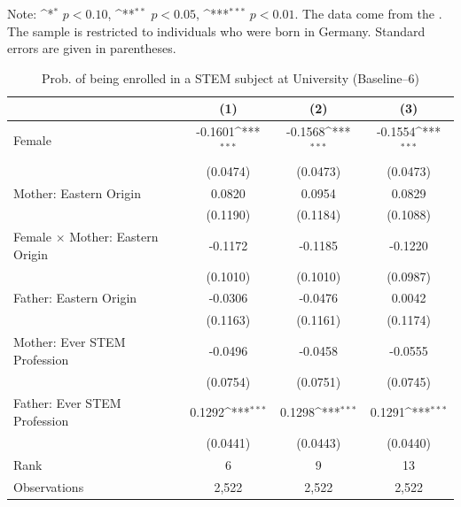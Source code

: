 \documentclass[a4paper, oneside, hyperfootnotes = false]{article}
\def\sym#1{\ifmmode^{#1}\else\(^{#1}\)\fi}
\begin{document}
{\begin{table}[ht]
\begin{center}
		\vspace{2mm}
		
		\parbox{10cm}{
			\linespread{1}\footnotesize Note: \sym{*} \(p<0.10\), \sym{**} \(p<0.05\), \sym{***} \(p<0.01\). The data come from the \cite{SOEP2023}. The sample is restricted to individuals who were born in Germany. Standard errors are given in parentheses.}
		
	\end{center}
\end{table}

\begin{table}[ht]
	\caption[STEM subject at University (Baseline--6)]{Prob. of being enrolled in a STEM subject at University (Baseline--6)}
	\label{tab:baseline--6}
	\begin{center}
		\begin{tabular}{l*{3}{c}}
			\toprule
			&\multicolumn{1}{c}{(1)}         &\multicolumn{1}{c}{(2)}         &\multicolumn{1}{c}{(3)}         \\
			\midrule
			Female              &     -0.1601\sym{***}&     -0.1568\sym{***}&     -0.1554\sym{***}\\
			&    (0.0474)         &    (0.0473)         &    (0.0473)         \\
			\addlinespace
			Mother: Eastern Origin&      0.0820         &      0.0954         &      0.0829         \\
			&    (0.1190)         &    (0.1184)         &    (0.1088)         \\
			\addlinespace
			Female $\times$ Mother: Eastern Origin&     -0.1172         &     -0.1185         &     -0.1220         \\
			&    (0.1010)         &    (0.1010)         &    (0.0987)         \\
			\addlinespace
			Father: Eastern Origin&     -0.0306         &     -0.0476         &      0.0042         \\
			&    (0.1163)         &    (0.1161)         &    (0.1174)         \\
			\addlinespace
			Mother: Ever STEM Profession&     -0.0496         &     -0.0458         &     -0.0555         \\
			&    (0.0754)         &    (0.0751)         &    (0.0745)         \\
			\addlinespace
			Father: Ever STEM Profession&      0.1292\sym{***}&      0.1298\sym{***}&      0.1291\sym{***}\\
			&    (0.0441)         &    (0.0443)         &    (0.0440)         \\
			\midrule
			Rank                &      6         &      9         &     13         \\
			Observations                   &   2,522         &   2,522         &   2,522         \\
			\bottomrule
		\end{tabular}
		

\end{center}
\end{table}}
\end{document}

